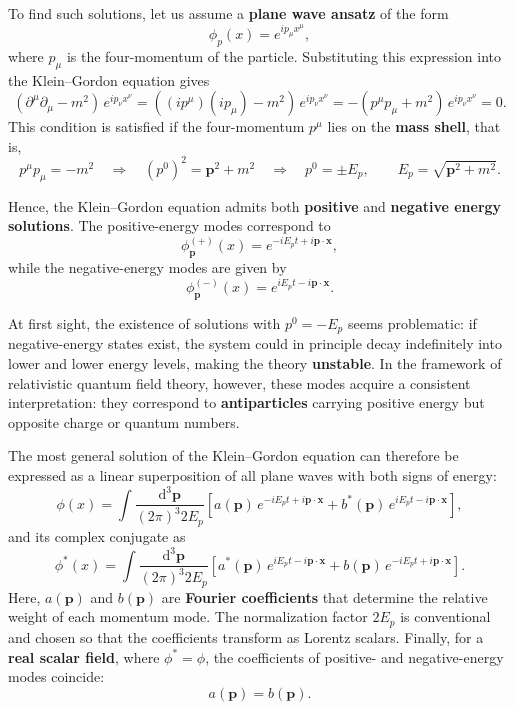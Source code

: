 To find such solutions, let us assume a \textbf{plane wave ansatz} of the form
\begin{equation}
    \phi_p(x) = e^{i p_\mu x^\mu},
\end{equation}
where \( p_\mu \) is the four-momentum of the particle.
Substituting this expression into the Klein–Gordon equation gives
\[
    (\partial^\mu \partial_\mu - m^2)\, e^{i p_\nu x^\nu}
    = ((ip^\mu)(ip_\mu) - m^2)\, e^{i p_\nu x^\nu}
    = -(p^\mu p_\mu + m^2)\, e^{i p_\nu x^\nu} = 0.
\]
This condition is satisfied if the four-momentum \( p^\mu \) lies on the \textbf{mass shell}, that is,
\[
    p^\mu p_\mu = -m^2
    \quad \Rightarrow \quad
    (p^0)^2 = \mathbf{p}^2 + m^2
    \quad \Rightarrow \quad
    p^0 = \pm E_p, \qquad
    E_p = \sqrt{\mathbf{p}^2 + m^2}.
\]

Hence, the Klein–Gordon equation admits both \textbf{positive} and \textbf{negative energy solutions}.
The positive-energy modes correspond to
\begin{equation}
    \phi^{(+)}_{\mathbf{p}}(x) = e^{-i E_p t + i \mathbf{p} \cdot \mathbf{x}},
    \label{eq:KG_positive_energy_plane_wave}
\end{equation}
while the negative-energy modes are given by
\begin{equation}
    \phi^{(-)}_{\mathbf{p}}(x) = e^{i E_p t - i \mathbf{p} \cdot \mathbf{x}}.
    \label{eq:KG_negative_energy_plane_wave}
\end{equation}

At first sight, the existence of solutions with \( p^0 = -E_p \) seems problematic: if negative-energy states exist, the system could in principle decay indefinitely into lower and lower energy levels, making the theory \textbf{unstable}.
In the framework of relativistic quantum field theory, however, these modes acquire a consistent interpretation: they correspond to \textbf{antiparticles} carrying positive energy but opposite charge or quantum numbers.

The most general solution of the Klein–Gordon equation can therefore be expressed as a linear superposition of all plane waves with both signs of energy:
\begin{equation}
    \phi(x) = \int \frac{\mathrm{d}^3 \mathbf{p}}{(2\pi)^3 2E_p}
    \left[
        a(\mathbf{p})\, e^{-i E_p t + i \mathbf{p} \cdot \mathbf{x}}
        + b^*(\mathbf{p})\, e^{i E_p t - i \mathbf{p} \cdot \mathbf{x}}
        \right],
    \label{eq:KG_general_solution_fourier}
\end{equation}
and its complex conjugate as
\[
    \phi^*(x) = \int \frac{\mathrm{d}^3 \mathbf{p}}{(2\pi)^3 2E_p}
    \left[
        a^*(\mathbf{p})\, e^{i E_p t - i \mathbf{p} \cdot \mathbf{x}}
        + b(\mathbf{p})\, e^{-i E_p t + i \mathbf{p} \cdot \mathbf{x}}
        \right].
\]
Here, \( a(\mathbf{p}) \) and \( b(\mathbf{p}) \) are \textbf{Fourier coefficients} that determine the relative weight of each momentum mode.
The normalization factor \( 2E_p \) is conventional and chosen so that the coefficients transform as Lorentz scalars.
Finally, for a \textbf{real scalar field}, where \( \phi^* = \phi \), the coefficients of positive- and negative-energy modes coincide:
\[
    a(\mathbf{p}) = b(\mathbf{p}).
\]

